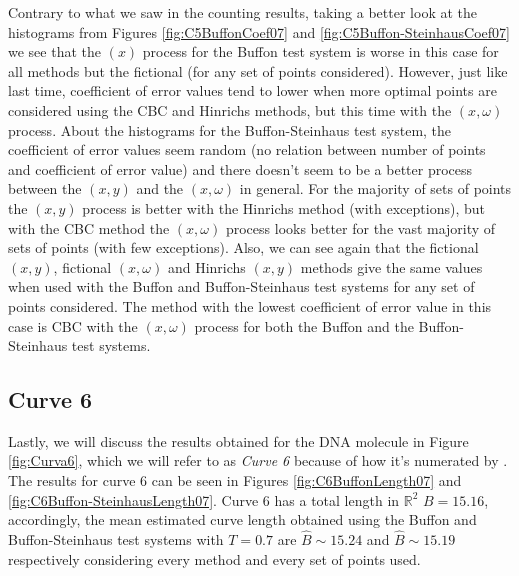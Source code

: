 Contrary to what we saw in the counting results, taking a better look at the histograms from Figures \ref{fig:C5BuffonCoef07} and \ref{fig:C5Buffon-SteinhausCoef07} we see that the $(x)$ process for the Buffon test system is worse in this case for all methods but the fictional (for any set of points considered). However, just like last time, coefficient of error values tend to lower when more optimal points are considered using the CBC and Hinrichs methods, but this time with the $(x,\omega)$ process. About the histograms for the Buffon-Steinhaus test system, the coefficient of error values seem random (no relation between number of points and coefficient of error value) and there doesn't seem to be a better process between the $(x,y)$ and the $(x,\omega)$ in general. For the majority of sets of points the $(x,y)$ process is better with the Hinrichs method (with exceptions), but with the CBC method the $(x,\omega)$ process looks better for the vast majority of sets of points (with few exceptions). Also, we can see again that the fictional $(x,y)$, fictional $(x,\omega)$ and Hinrichs $(x,y)$ methods give the same values when used with the Buffon and Buffon-Steinhaus test systems for any set of points considered. The method with the lowest coefficient of error value in this case is CBC with the $(x,\omega)$ process for both the Buffon and the Buffon-Steinhaus test systems.\\









\subsection{Curve 6}
Lastly, we will discuss the results obtained for the DNA molecule in Figure \ref{fig:Curva6}, which we will refer to as \textit{Curve 6} because of how it's numerated by \cite{adn.pdf}. The results for curve 6 can be seen in Figures \ref{fig:C6BuffonLength07} and \ref{fig:C6Buffon-SteinhausLength07}. Curve 6 has a total length in $\mathbb{R}^2$ $B=15.16$, accordingly, the mean estimated curve length obtained using the Buffon and Buffon-Steinhaus test systems with $T=0.7$ are $\widehat{B} \sim 15.24$ and $\widehat{B} \sim 15.19$ respectively considering every method and every set of points used.\\


